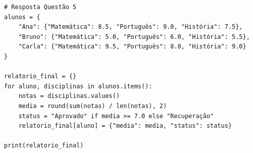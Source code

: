\ifmostrarGabarito
\begin{verbatim}
# Resposta Questão 5
alunos = {
    "Ana": {"Matemática": 8.5, "Português": 9.0, "História": 7.5},
    "Bruno": {"Matemática": 5.0, "Português": 6.0, "História": 5.5},
    "Carla": {"Matemática": 9.5, "Português": 8.0, "História": 9.0}
}

relatorio_final = {}
for aluno, disciplinas in alunos.items():
    notas = disciplinas.values()
    media = round(sum(notas) / len(notas), 2)
    status = "Aprovado" if media >= 7.0 else "Recuperação"
    relatorio_final[aluno] = {"media": media, "status": status}

print(relatorio_final)
\end{verbatim}
\fi
